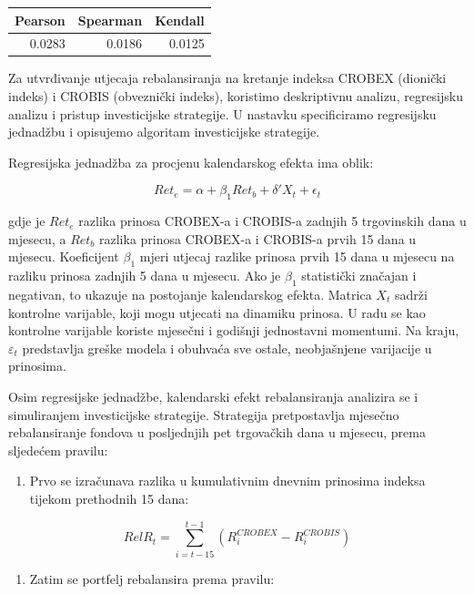 \documentclass[
  letterpaper,
  DIV=11,
  numbers=noendperiod]{scrartcl}
\providecommand{\tightlist}{%
  \setlength{\itemsep}{0pt}\setlength{\parskip}{0pt}}\usepackage{longtable,booktabs,array}
\begin{document}
\begin{tabular}[t]{r|r|r}
\hline
Pearson & Spearman & Kendall\\
\hline
0.0283 & 0.0186 & 0.0125\\
\hline
\end{tabular}

Za utvrđivanje utjecaja rebalansiranja na kretanje indeksa CROBEX
(dionički indeks) i CROBIS (obveznički indeks), koristimo deskriptivnu
analizu, regresijsku analizu i pristup investicijske strategije. U
nastavku specificiramo regresijsku jednadžbu i opisujemo algoritam
investicijske strategije.

Regresijska jednadžba za procjenu kalendarskog efekta ima oblik:

\[Ret_{e} = \alpha + \beta_1 Ret_{b} + \delta' X_t + \epsilon_t\]

gdje je \(Ret_{e}\) razlika prinosa CROBEX-a i CROBIS-a zadnjih 5
trgovinskih dana u mjesecu, a \(Ret_{b}\) razlika prinosa CROBEX-a i
CROBIS-a prvih 15 dana u mjesecu. Koeficijent \(\beta_1\) mjeri utjecaj
razlike prinosa prvih 15 dana u mjesecu na razliku prinosa zadnjih 5
dana u mjesecu. Ako je \(\beta_1\) statistički značajan i negativan, to
ukazuje na postojanje kalendarskog efekta. Matrica \(X_t\) sadrži
kontrolne varijable, koji mogu utjecati na dinamiku prinosa. U radu se
kao kontrolne varijable koriste mjesečni i godišnji jednostavni
momentumi. Na kraju, \(\varepsilon_{t}\) predstavlja greške modela i
obuhvaća sve ostale, neobjašnjene varijacije u prinosima.

Osim regresijske jednadžbe, kalendarski efekt rebalansiranja analizira
se i simuliranjem investicijske strategije. Strategija pretpostavlja
mjesečno rebalansiranje fondova u posljednjih pet trgovačkih dana u
mjesecu, prema sljedećem pravilu:

\begin{enumerate}
\def\labelenumi{\arabic{enumi})}
\tightlist
\item
  Prvo se izračunava razlika u kumulativnim dnevnim prinosima indeksa
  tijekom prethodnih 15 dana:
\end{enumerate}

\[RelR_{t} = \sum_{i=t-15}^{t-1} (R_i^{CROBEX} - R_i^{CROBIS})\]

\begin{enumerate}
\def\labelenumi{\arabic{enumi})}
\setcounter{enumi}{1}
\tightlist
\item
  Zatim se portfelj rebalansira prema pravilu:
\end{enumerate}
\end{document}

